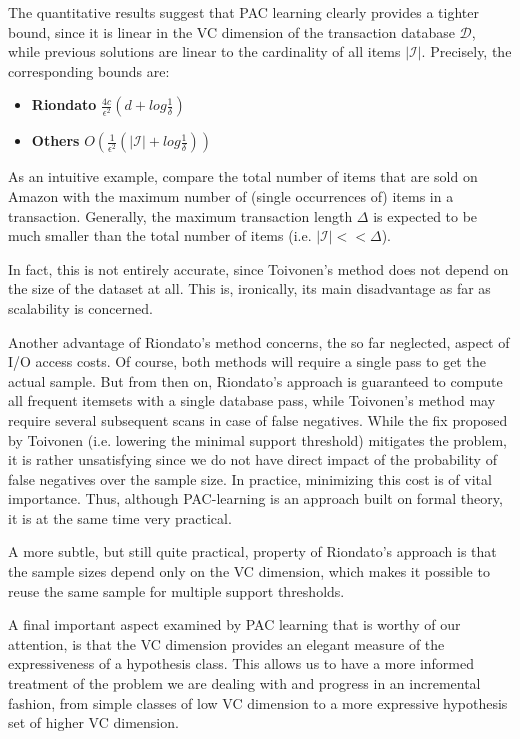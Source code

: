 \documentclass[11pt]{sigplanconf}
\renewcommand\bf{\textbf}
\newcommand\I{\mathcal{I}}
\newcommand\D{\mathcal{D}}
\begin{document}
The quantitative results suggest that PAC learning clearly provides a tighter bound, since it is linear in the VC dimension of the transaction database $\D$, while previous solutions are linear to the cardinality of all items $|\I|$. Precisely, the corresponding bounds are:
\begin{itemize}
\item \bf{Riondato} $\frac{4c}{\epsilon^2}(d + log\frac{1}{\delta})$
\item \bf{Others} $O(\frac{1}{\epsilon^2}(|\I| + log\frac{1}{\delta}))$
\end{itemize}
As an intuitive example, compare the total number of items that are sold on Amazon with the maximum number of (single occurrences of) items in a transaction. Generally, the maximum transaction length $\Delta$ is expected to be much smaller than the total number of items (i.e. $|\I| << \Delta$).

In fact, this is not entirely accurate, since Toivonen's method does not depend on the size of the dataset at all. This is, ironically, its main disadvantage as far as scalability is concerned.

Another advantage of Riondato's method concerns, the so far neglected, aspect of I/O access costs. Of course, both methods will require a single pass to get the actual sample. But from then on, Riondato's approach is guaranteed to compute all frequent itemsets with a single database pass, while Toivonen's method may require several subsequent scans in case of false negatives. While the fix proposed by Toivonen (i.e. lowering the minimal support threshold) mitigates the problem, it is rather unsatisfying since we do not have direct impact of the probability of false negatives over the sample size. In practice, minimizing this cost is of vital importance. Thus, although PAC-learning is an approach built on formal theory, it is at the same time very practical.

A more subtle, but still quite practical, property of Riondato's approach is that the sample sizes depend only on the VC dimension, which makes it possible to reuse the same sample for multiple support thresholds.

A final important aspect examined by PAC learning that is worthy of our attention, is that the VC dimension provides an elegant measure of the expressiveness of a hypothesis class. This allows us to have a more informed treatment of the problem we are dealing with and progress in an incremental fashion, from simple classes of low VC dimension to a more expressive hypothesis set of higher VC dimension.
\end{document}
